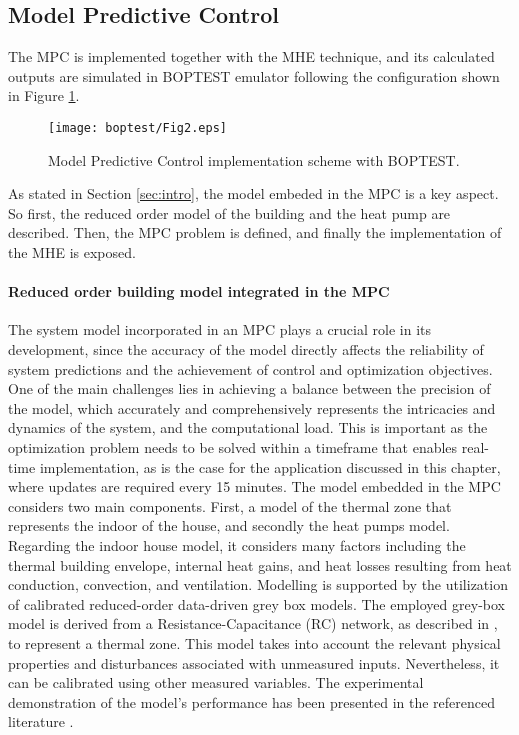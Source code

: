 \newpage
\subsection{Model Predictive Control}
\label{sec:MPC}
The MPC is implemented together with the MHE technique, and its calculated outputs are simulated in BOPTEST emulator following the configuration shown in Figure \ref{fig:2}.

\begin{figure}
  \texttt{[image: boptest/Fig2.eps]}
\caption{Model Predictive Control implementation scheme with BOPTEST.}
\label{fig:2}       %
\end{figure}
%

As stated in Section \ref{sec:intro}, the model embeded in the MPC is a key aspect. So first, the reduced order model of the building and the heat pump are described. Then, the MPC problem is defined, and finally the implementation of the MHE is exposed.

\paragraph{Reduced order building model integrated in the MPC} 

The system model incorporated in an MPC plays a crucial role in its development, since the accuracy of the model directly affects the reliability of system predictions and the achievement of control and optimization objectives. One of the main challenges lies in achieving a balance between the precision of the model, which accurately and comprehensively represents the intricacies and dynamics of the system, and the computational load. This is important as the optimization problem needs to be solved within a timeframe that enables real-time implementation, as is the case for the application discussed in this chapter, where updates are required every 15 minutes.
The model embedded in the MPC considers two main components. First, a model of the thermal zone that represents the indoor of the house, and secondly the heat pumps model.
Regarding the indoor house model, it considers many factors including the thermal building envelope, internal heat gains, and heat losses resulting from heat conduction, convection, and ventilation. Modelling is supported by the utilization of calibrated reduced-order data-driven grey box models. The employed grey-box model is derived from a Resistance-Capacitance (RC) network, as described in \cite{Kim2018_2}, to represent a thermal zone. This model takes into account the relevant physical properties and disturbances associated with unmeasured inputs. Nevertheless, it can be calibrated using other measured variables. The experimental demonstration of the model's performance has been presented in the referenced literature \cite{Kim2016}.

